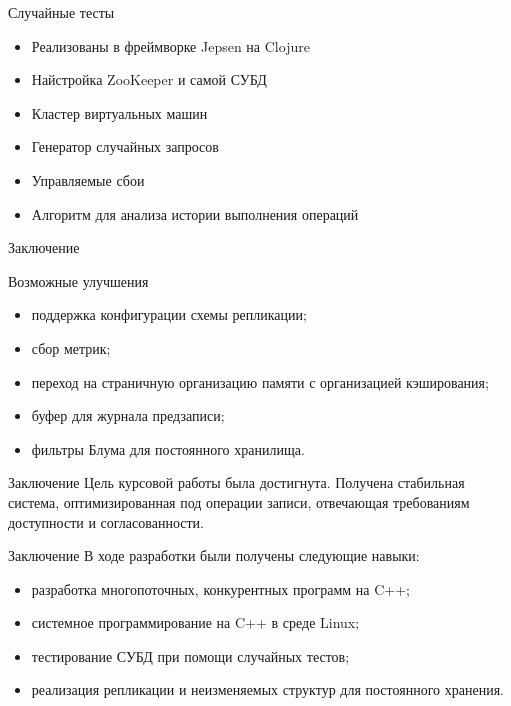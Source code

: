\documentclass{beamer}
\begin{document}
\begin{frame}{Случайные тесты}
  \begin{alertblock}{}
    \begin{itemize}
      \item Реализованы в фреймворке Jepsen на Clojure
      \item Найстройка ZooKeeper и самой СУБД
      \item Кластер виртуальных машин
      \item Генератор случайных запросов
      \item Управляемые сбои
      \item Алгоритм для анализа истории выполнения операций
    \end{itemize}
  \end{alertblock}
\end{frame}

\begin{frame}{Заключение}
  \begin{alertblock}{Возможные улучшения}
  \begin{itemize}
    \item поддержка конфигурации схемы репликации;
    \item сбор метрик;
    \item переход на страничную организацию памяти с организацией кэширования;
    \item буфер для журнала предзаписи;
    \item фильтры Блума для постоянного хранилища.
  \end{itemize}
  \end{alertblock}
\end{frame}

\begin{frame}{Заключение}
  Цель курсовой работы была достигнута. Получена стабильная система,
  оптимизированная под операции записи, отвечающая требованиям доступности и
  согласованности.

\end{frame}

\begin{frame}{Заключение}
  В ходе разработки были получены следующие навыки:
    \begin{itemize}
      \item разработка многопоточных, конкурентных программ на C++;
      \item системное программирование на C++ в среде Linux;
      \item тестирование СУБД при помощи случайных тестов;
      \item реализация репликации и неизменяемых структур для постоянного
            хранения.
    \end{itemize}
\end{frame}
\end{document}
